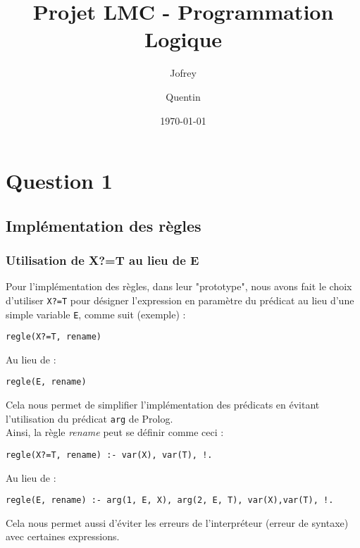 \documentclass[12pt]{article} %
\title{Projet LMC - Programmation Logique}
\author{Jofrey \bsc{Luc} \and Quentin \bsc{Sonrel}}
\date\today
\begin{document}

\maketitle


\section*{Question 1}

\subsection*{Implémentation des règles}

\subsubsection*{Utilisation de X?=T au lieu de E}

Pour l'implémentation des règles, dans leur "prototype", nous avons fait le choix d'utiliser \verb|X?=T| pour désigner l'expression en paramètre du prédicat au lieu d'une simple variable \verb|E|, comme suit (exemple) :

\begin{center}
\verb|regle(X?=T, rename)|
\end{center}

Au lieu de :

\begin{center}
	\verb|regle(E, rename)|
\end{center}

Cela nous permet de simplifier l'implémentation des prédicats en évitant l'utilisation du prédicat \verb|arg| de Prolog.\\
Ainsi, la règle \textit{rename} peut se définir comme ceci :

\begin{center}
	\verb|regle(X?=T, rename) :- var(X), var(T), !.|
\end{center}

Au lieu de :

\begin{center}
	\verb|regle(E, rename) :- arg(1, E, X), arg(2, E, T), var(X),var(T), !.|
\end{center}

Cela nous permet aussi d'éviter les erreurs de l'interpréteur (erreur de syntaxe) avec certaines expressions.\\
\end{document}
